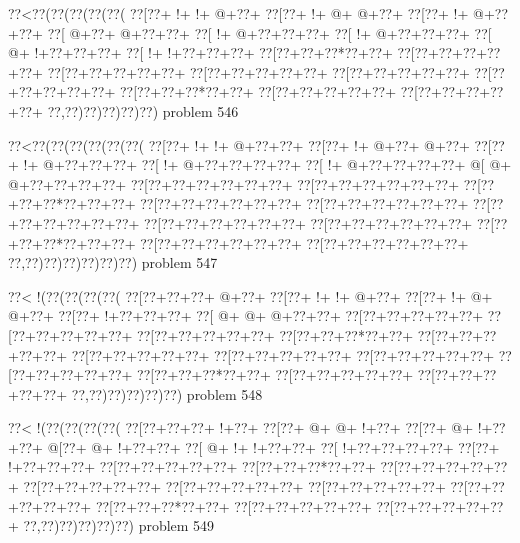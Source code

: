 \vbox{\vbox{\goo
\0??<\0??(\0??(\0??(\0??(\0??(
\0??[\0??+\- !+\- !+\- @+\0??+
\0??[\0??+\- !+\- @+\- @+\0??+
\0??[\0??+\- !+\- @+\0??+\0??+
\0??[\- @+\0??+\- @+\0??+\0??+
\0??[\- !+\- @+\0??+\0??+\0??+
\0??[\- !+\- @+\0??+\0??+\0??+
\0??[\- @+\- !+\0??+\0??+\0??+
\0??[\- !+\- !+\0??+\0??+\0??+
\0??[\0??+\0??+\0??*\0??+\0??+
\0??[\0??+\0??+\0??+\0??+\0??+
\0??[\0??+\0??+\0??+\0??+\0??+
\0??[\0??+\0??+\0??+\0??+\0??+
\0??[\0??+\0??+\0??+\0??+\0??+
\0??[\0??+\0??+\0??+\0??+\0??+
\0??[\0??+\0??+\0??*\0??+\0??+
\0??[\0??+\0??+\0??+\0??+\0??+
\0??[\0??+\0??+\0??+\0??+\0??+
\0??,\0??)\0??)\0??)\0??)\0??)
}
\hfil problem 546\hfil\break
}

\vbox{\vbox{\goo
\0??<\0??(\0??(\0??(\0??(\0??(\0??(
\0??[\0??+\- !+\- !+\- @+\0??+\0??+
\0??[\0??+\- !+\- @+\0??+\- @+\0??+
\0??[\0??+\- !+\- @+\0??+\0??+\0??+
\0??[\- !+\- @+\0??+\0??+\0??+\0??+
\0??[\- !+\- @+\0??+\0??+\0??+\0??+
\- @[\- @+\- @+\0??+\0??+\0??+\0??+
\0??[\0??+\0??+\0??+\0??+\0??+\0??+
\0??[\0??+\0??+\0??+\0??+\0??+\0??+
\0??[\0??+\0??+\0??*\0??+\0??+\0??+
\0??[\0??+\0??+\0??+\0??+\0??+\0??+
\0??[\0??+\0??+\0??+\0??+\0??+\0??+
\0??[\0??+\0??+\0??+\0??+\0??+\0??+
\0??[\0??+\0??+\0??+\0??+\0??+\0??+
\0??[\0??+\0??+\0??+\0??+\0??+\0??+
\0??[\0??+\0??+\0??*\0??+\0??+\0??+
\0??[\0??+\0??+\0??+\0??+\0??+\0??+
\0??[\0??+\0??+\0??+\0??+\0??+\0??+
\0??,\0??)\0??)\0??)\0??)\0??)\0??)
}
\hfil problem 547\hfil\break
}

\vbox{\vbox{\goo
\0??<\- !(\0??(\0??(\0??(\0??(
\0??[\0??+\0??+\0??+\- @+\0??+
\0??[\0??+\- !+\- !+\- @+\0??+
\0??[\0??+\- !+\- @+\- @+\0??+
\0??[\0??+\- !+\0??+\0??+\0??+
\0??[\- @+\- @+\- @+\0??+\0??+
\0??[\0??+\0??+\0??+\0??+\0??+
\0??[\0??+\0??+\0??+\0??+\0??+
\0??[\0??+\0??+\0??+\0??+\0??+
\0??[\0??+\0??+\0??*\0??+\0??+
\0??[\0??+\0??+\0??+\0??+\0??+
\0??[\0??+\0??+\0??+\0??+\0??+
\0??[\0??+\0??+\0??+\0??+\0??+
\0??[\0??+\0??+\0??+\0??+\0??+
\0??[\0??+\0??+\0??+\0??+\0??+
\0??[\0??+\0??+\0??*\0??+\0??+
\0??[\0??+\0??+\0??+\0??+\0??+
\0??[\0??+\0??+\0??+\0??+\0??+
\0??,\0??)\0??)\0??)\0??)\0??)
}
\hfil problem 548\hfil\break
}

\vbox{\vbox{\goo
\0??<\- !(\0??(\0??(\0??(\0??(
\0??[\0??+\0??+\0??+\- !+\0??+
\0??[\0??+\- @+\- @+\- !+\0??+
\0??[\0??+\- @+\- !+\0??+\0??+
\- @[\0??+\- @+\- !+\0??+\0??+
\0??[\- @+\- !+\- !+\0??+\0??+
\0??[\- !+\0??+\0??+\0??+\0??+
\0??[\0??+\- !+\0??+\0??+\0??+
\0??[\0??+\0??+\0??+\0??+\0??+
\0??[\0??+\0??+\0??*\0??+\0??+
\0??[\0??+\0??+\0??+\0??+\0??+
\0??[\0??+\0??+\0??+\0??+\0??+
\0??[\0??+\0??+\0??+\0??+\0??+
\0??[\0??+\0??+\0??+\0??+\0??+
\0??[\0??+\0??+\0??+\0??+\0??+
\0??[\0??+\0??+\0??*\0??+\0??+
\0??[\0??+\0??+\0??+\0??+\0??+
\0??[\0??+\0??+\0??+\0??+\0??+
\0??,\0??)\0??)\0??)\0??)\0??)
}
\hfil problem 549\hfil\break
}

